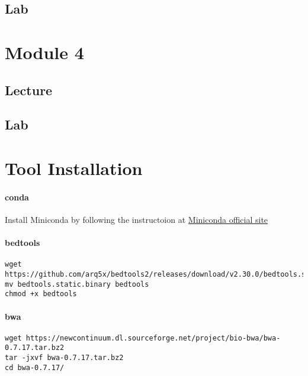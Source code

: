 \documentclass[
]{book}
\begin{document}
\section{Lab}\label{lab-2}

\chapter{Module 4}\label{module-4}

\section{Lecture}\label{lecture-3}

\section{Lab}\label{lab-3}

\chapter{Tool Installation}\label{tool-installation}

\subsubsection{conda}\label{conda}

Install Miniconda by following the instructoion at \href{https://docs.conda.io/en/main/miniconda.html}{Miniconda official site}

\subsubsection{bedtools}\label{bedtools}

\begin{verbatim}
wget https://github.com/arq5x/bedtools2/releases/download/v2.30.0/bedtools.static.binary
mv bedtools.static.binary bedtools
chmod +x bedtools
\end{verbatim}

\subsubsection{bwa}\label{bwa}

\begin{verbatim}
wget https://newcontinuum.dl.sourceforge.net/project/bio-bwa/bwa-0.7.17.tar.bz2
tar -jxvf bwa-0.7.17.tar.bz2
cd bwa-0.7.17/
\end{verbatim}
\end{document}
